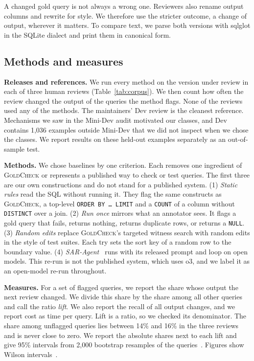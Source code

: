 \documentclass[conference]{IEEEtran}
\newcommand{\sys}{\textsc{GoldCheck}}
\begin{document}
A changed gold query is not always a wrong one. Reviewers also rename output
columns and rewrite for style. We therefore use the stricter outcome, a change of
output, wherever it matters. To compare text, we parse both versions with
sqlglot in the SQLite dialect and print them in canonical form.

\subsection{Methods and measures}
\textbf{Releases and references.} We run every method on the version under
review in each of three human reviews (Table~\ref{tab:corpus}). We then count how
often the review changed the output of the queries the method flags. None of the
reviews used any of the methods. The maintainers' Dev review is the cleanest
reference. Mechanisms we saw in the Mini-Dev audit motivated our classes, and Dev contains 1,036 examples outside Mini-Dev that we did not inspect when we chose the classes. We report results on these held-out examples separately as an out-of-sample test.

\textbf{Methods.} We chose baselines by one criterion. Each removes one
ingredient of \sys{} or represents a published way to check or test queries.
The first three are our own constructions and do not stand for a published
system. (1) \emph{Static rules} read the SQL without running it. They
flag the same constructs as \sys{}, a top-level \texttt{ORDER BY \ldots{} LIMIT}
and a \texttt{COUNT} of a column without \texttt{DISTINCT} over a join. (2)
\emph{Run once} mirrors what an annotator sees. It flags a gold query that fails,
returns nothing, returns duplicate rows, or returns a \texttt{NULL}. (3)
\emph{Random edits} replace \sys{}'s targeted witness search with random edits in
the style of test suites. Each try sets the sort key of a random row to the
boundary value. (4) \emph{SAR-Agent}~\cite{jin2026pervasive} runs with its released prompt and loop on open models. This re-run is not the published system, which uses o3, and we label it as an open-model re-run throughout.

\textbf{Measures.} For a set of flagged queries, we report the share whose
output the next review changed. We divide this share by the share among all
other queries and call the ratio \emph{lift}. We also report the recall of all
output changes, and we report cost as time per query. Lift is a ratio, so we checked its denominator. The share among unflagged queries lies between 14\% and 16\% in the three reviews and is never close to zero. We report the absolute shares next to each lift and give 95\% intervals from 2,000 bootstrap resamples of the queries~\cite{efron1979bootstrap}. Figures show Wilson intervals~\cite{wilson1927}.
\end{document}
